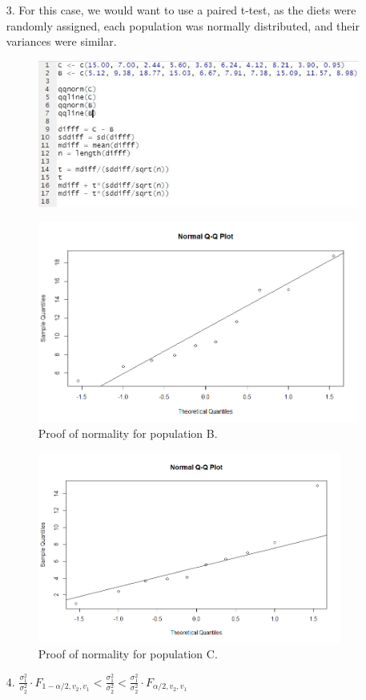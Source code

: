 \documentclass[12pt]{article}
\begin{document}
\begin{enumerate}
	\item[3.] For this case, we would want to use a paired t-test, as 
		the diets were randomly assigned, each population was normally distributed, and their variances were similar.
		\begin{figure}[!h]
			\centering
			\includegraphics[width=11cm]{p3.JPG}
		\end{figure}
		\begin{figure}[!h]
			\centering
			\includegraphics[width=11cm]{plotB.png}
			\caption{Proof of normality for population B.}
		\end{figure}
		\begin{figure}[!h]
			\centering
			\includegraphics[width=10cm]{plotC.png}
			\caption{Proof of normality for population C.}
		\end{figure}
\end{enumerate}
\begin{enumerate}
	\item[4.] $\frac{\sigma^2_1}{\sigma^2_2} \cdot F_{1-\alpha/2, v_2, v_1} < \frac{\sigma^2_1}{\sigma^2_2} < \frac{\sigma^2_1}{\sigma^2_2} \cdot F_{\alpha/2, v_2, v_1}$
\end{enumerate}
\end{document}
